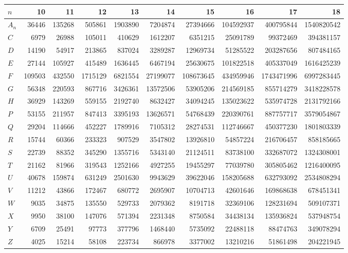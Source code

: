 \begin{tabular}{@{}lrrrrrrrrr@{}}
\toprule
$n$ & 10 & 11 & 12 & 13 & 14 & 15 & 16 & 17 & 18\\
\midrule
$A_n$ & 36446 & 135268 & 505861 & 1903890 & 7204874 & 27394666 & 104592937 & 400795844 & 1540820542\\
\midrule
$C$ & 6979 & 26988 & 105011 & 410629 & 1612207 & 6351215 & 25091789 & 99372469 & 394381157\\
$D$ & 14190 & 54917 & 213865 & 837024 & 3289287 & 12969734 & 51285522 & 203287656 & 807484165\\
$E$ & 27144 & 105927 & 415489 & 1636445 & 6467194 & 25630675 & 101822518 & 405337049 & 1616425239\\
$F$ & 109503 & 432550 & 1715129 & 6821554 & 27199077 & 108673645 & 434959946 & 1743471996 & 6997283445\\
$G$ & 56348 & 220593 & 867716 & 3426361 & 13572506 & 53905206 & 214569185 & 855714279 & 3418228578\\
$H$ & 36929 & 143269 & 559155 & 2192740 & 8632427 & 34094245 & 135023622 & 535974728 & 2131792166\\
$P$ & 53155 & 211957 & 847413 & 3395193 & 13626571 & 54768439 & 220390761 & 887757717 & 3579054867\\
$Q$ & 29204 & 114666 & 452227 & 1789916 & 7105312 & 28274531 & 112746667 & 450377230 & 1801803339\\
$R$ & 15744 & 60366 & 233323 & 907529 & 3547802 & 13926810 & 54857224 & 216706457 & 858185665\\
$S$ & 22739 & 88352 & 345290 & 1355716 & 5343140 & 21124511 & 83738100 & 332687072 & 1324308001\\
$T$ & 21162 & 81966 & 319543 & 1252166 & 4927255 & 19455297 & 77039780 & 305805462 & 1216400095\\
$U$ & 40678 & 159874 & 631249 & 2501630 & 9943629 & 39622046 & 158205688 & 632793092 & 2534808294\\
$V$ & 11212 & 43866 & 172467 & 680772 & 2695907 & 10704713 & 42601646 & 169868638 & 678451341\\
$W$ & 9035 & 34875 & 135550 & 529733 & 2079362 & 8191718 & 32369106 & 128231694 & 509107371\\
$X$ & 9950 & 38100 & 147076 & 571394 & 2231348 & 8750584 & 34438134 & 135936824 & 537948754\\
$Y$ & 6709 & 25491 & 97773 & 377796 & 1468440 & 5735092 & 22488118 & 88474763 & 349078294\\
$Z$ & 4025 & 15214 & 58108 & 223734 & 866978 & 3377002 & 13210216 & 51861498 & 204221945\\
\bottomrule
\end{tabular}
